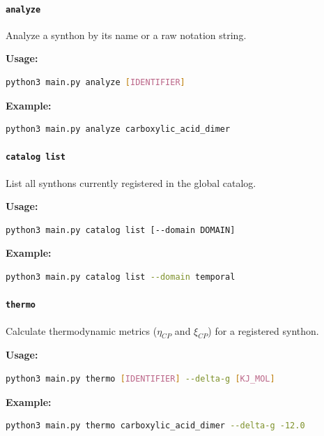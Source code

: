 \documentclass[12pt,a4paper]{article}
\begin{document}
\paragraph{\texttt{analyze}}

Analyze a synthon by its name or a raw notation string.

\textbf{Usage:}

\begin{lstlisting}[language=bash]
python3 main.py analyze [IDENTIFIER]
\end{lstlisting}

\textbf{Example:}

\begin{lstlisting}[language=bash]
python3 main.py analyze carboxylic_acid_dimer
\end{lstlisting}

\paragraph{\texttt{catalog list}}

List all synthons currently registered in the global catalog.

\textbf{Usage:}

\begin{lstlisting}[language=bash]
python3 main.py catalog list [--domain DOMAIN]
\end{lstlisting}

\textbf{Example:}

\begin{lstlisting}[language=bash]
python3 main.py catalog list --domain temporal
\end{lstlisting}

\paragraph{\texttt{thermo}}

Calculate thermodynamic metrics ($\eta_{CP}$ and $\xi_{CP}$) for a registered synthon.

\textbf{Usage:}

\begin{lstlisting}[language=bash]
python3 main.py thermo [IDENTIFIER] --delta-g [KJ_MOL]
\end{lstlisting}

\textbf{Example:}

\begin{lstlisting}[language=bash]
python3 main.py thermo carboxylic_acid_dimer --delta-g -12.0
\end{lstlisting}
\end{document}
